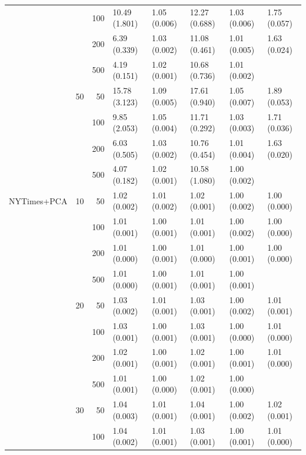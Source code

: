 \begin{longtable}{p{}lrlllll}
      &     & 100 &  10.49 (1.801) &   1.05 (0.006) &  12.27 (0.688) &         1.03 (0.006) &  1.75 (0.057) \\
      &     & 200 &   6.39 (0.339) &   1.03 (0.002) &  11.08 (0.461) &         1.01 (0.005) &  1.63 (0.024) \\
      &     & 500 &   4.19 (0.151) &   1.02 (0.001) &  10.68 (0.736) &         1.01 (0.002) &            \\
      & 50  & 50  &  15.78 (3.123) &   1.09 (0.005) &  17.61 (0.940) &         1.05 (0.007) &  1.89 (0.053) \\
      &     & 100 &   9.85 (2.053) &   1.05 (0.004) &  11.71 (0.292) &         1.03 (0.003) &  1.71 (0.036) \\
      &     & 200 &   6.03 (0.505) &   1.03 (0.002) &  10.76 (0.454) &         1.01 (0.004) &  1.63 (0.020) \\
      &     & 500 &   4.07 (0.182) &   1.02 (0.001) &  10.58 (1.080) &         1.00 (0.002) &            \\
\midrule
NYTimes+PCA & 10  & 50  &   1.02 (0.002) &   1.01 (0.002) &   1.02 (0.001) &         1.00 (0.002) &  1.00 (0.000) \\
      &     & 100 &   1.01 (0.001) &   1.00 (0.001) &   1.01 (0.001) &         1.00 (0.002) &  1.00 (0.000) \\
      &     & 200 &   1.01 (0.000) &   1.00 (0.001) &   1.01 (0.000) &         1.00 (0.001) &  1.00 (0.000) \\
      &     & 500 &   1.01 (0.000) &   1.00 (0.001) &   1.01 (0.001) &         1.00 (0.001) &            \\
      & 20  & 50  &   1.03 (0.002) &   1.01 (0.001) &   1.03 (0.001) &         1.00 (0.002) &  1.01 (0.001) \\
      &     & 100 &   1.03 (0.001) &   1.00 (0.001) &   1.03 (0.001) &         1.00 (0.000) &  1.01 (0.000) \\
      &     & 200 &   1.02 (0.001) &   1.00 (0.001) &   1.02 (0.001) &         1.00 (0.001) &  1.01 (0.000) \\
      &     & 500 &   1.01 (0.001) &   1.00 (0.000) &   1.02 (0.001) &         1.00 (0.000) &            \\
      & 30  & 50  &   1.04 (0.003) &   1.01 (0.001) &   1.04 (0.001) &         1.00 (0.002) &  1.02 (0.001) \\
      &     & 100 &   1.04 (0.002) &   1.01 (0.001) &   1.03 (0.001) &         1.00 (0.001) &  1.01 (0.000) \\

\end{longtable}
